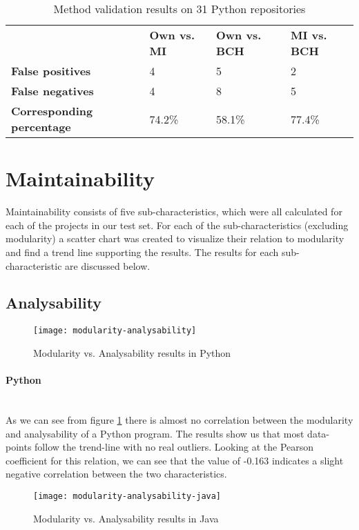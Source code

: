\documentclass[twoside]{uva-inf-bachelor-thesis}
\newcommand{\myparagraph}[1]{\paragraph{#1}\mbox{}\\}
\begin{document}
\begin{table}[H]
\centering
\caption{Method validation results on 31 Python repositories}
\label{table:validation}
\begin{tabular}{llll}
\textbf{}                         & \textbf{Own vs. MI} & \textbf{Own vs. BCH} & \textbf{MI vs. BCH} \\ 
\textbf{False positives}          & 4                   & 5                    & 2                   \\
\textbf{False negatives}          & 4                   & 8                    & 5                   \\
\textbf{Corresponding percentage} & 74.2\%              & 58.1\%               & 77.4\%             
\end{tabular}
\end{table}

\section{Maintainability}
Maintainability consists of five sub-characteristics, which were all calculated for each of the projects in our test set. For each of the sub-characteristics (excluding modularity) a scatter chart was created to visualize their relation to modularity and find a trend line supporting the results. The results for each sub-characteristic are discussed below.

\subsection{Analysability}

\begin{figure}[H]
    \caption{Modularity vs. Analysability results in Python}
    \label{figure:mod-analysis}
    \centering
        \texttt{[image: modularity-analysability]}
\end{figure}

\myparagraph{Python}
As we can see from figure \ref{figure:mod-analysis} there is almost no correlation between the modularity and analysability of a Python program. The results show us that most data-points follow the trend-line with no real outliers. Looking at the Pearson coefficient for this relation, we can see that the value of -0.163 indicates a slight negative correlation between the two characteristics.

\begin{figure}[H]
    \caption{Modularity vs. Analysability results in Java}
    \label{figure:mod-analysis-java}
    \centering
        \texttt{[image: modularity-analysability-java]}
\end{figure}
\end{document}
